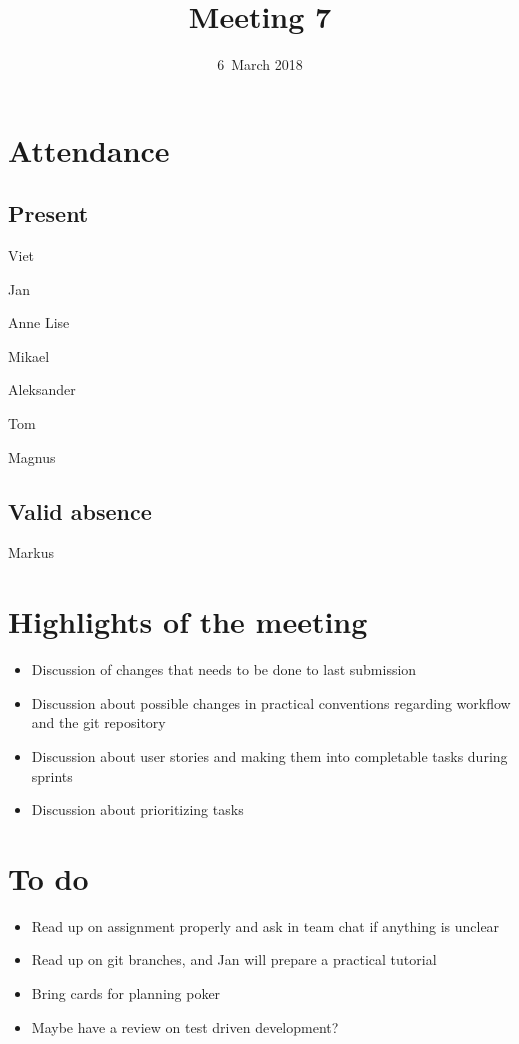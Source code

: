 \documentclass[letterpaper,11pt]{article}
\title{Meeting 7}
\date{6~March 2018}
\begin{document}
\maketitle
\section*{Attendance}
\subsection*{Present}
\begin{list}{}{}
	\item Viet
	\item Jan
	\item Anne Lise
	\item Mikael
	\item Aleksander
	\item Tom
	\item Magnus
\end{list}
\subsection*{Valid absence}
\begin{list}{}{}
	\item Markus
\end{list}

\newpage
\section*{Highlights of the meeting}
\begin{itemize}
	\item Discussion of changes that needs to be done to last submission
	\item Discussion about possible changes in practical conventions regarding workflow and the git repository
	\item Discussion about user stories and making them into completable tasks during sprints
	\item Discussion about prioritizing tasks
\end{itemize}

\section*{To do}
\begin{itemize}
	\item Read up on assignment properly and ask in team chat if anything is unclear
	\item Read up on git branches, and Jan will prepare a practical tutorial
	\item Bring cards for planning poker
	\item Maybe have a review on test driven development?
\end{itemize}
\end{document}
